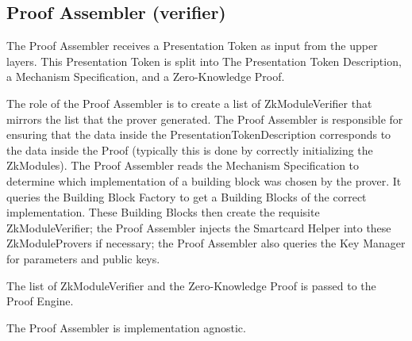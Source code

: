   \subsection{Proof Assembler (verifier)}
    The Proof Assembler receives a Presentation Token as input from the upper layers. This
    Presentation Token is split into The Presentation Token Description, a Mechanism Specification,
    and a Zero-Knowledge Proof.

    The role of the Proof Assembler is to create a list of ZkModuleVerifier that mirrors the list
    that the prover generated. The Proof Assembler is responsible for ensuring that the data inside the
    PresentationTokenDescription corresponds to the data inside the Proof (typically this is done by
    correctly initializing the ZkModules).
    The Proof Assembler reads the Mechanism Specification to determine which implementation of a building
    block was chosen by the prover. It queries the Building Block Factory to get a Building Blocks of the correct implementation.
    These Building Blocks then create the requisite ZkModuleVerifier; the Proof Assembler injects
    the Smartcard Helper into these ZkModuleProvers if necessary;
    the Proof Assembler also queries the Key Manager for parameters and public keys.

    The list of ZkModuleVerifier and the Zero-Knowledge Proof is passed to the Proof Engine.

    The Proof Assembler is implementation agnostic.

